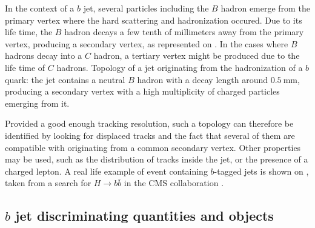     In the context of a $b$ jet, several particles including the $B$ hadron emerge from
    the primary vertex where the hard scattering and hadronization occured. Due to its
    life time, the $B$ hadron decays a few tenth of millimeters away from the primary
    vertex, producing a secondary vertex, as represented on .
    In the cases where $B$ hadrons decay into a $C$ hadron, a tertiary vertex might
    be produced due to the life time of $C$ hadrons.
                 {Topology of a jet originating from the hadronization of a $b$ quark: the
                 jet contains a neutral $B$ hadron with a decay length around $0.5~\text{mm}$,
                 producing a secondary vertex with a high multiplicity of charged particles
                 emerging from it.}

    Provided a good enough tracking resolution, such a topology can therefore be identified
    by looking for displaced tracks and the fact that several of them are compatible with
    originating from a common secondary vertex. Other properties may be used, such as the
    distribution of tracks inside the jet, or the presence of a charged lepton. A
    real life example of event containing $b$-tagged jets is shown on ,
    taken from a search for $H\rightarrow b\bar{b}$ in the CMS collaboration \cite{HIG-13-011}.


    \subsection{$b$ jet discriminating quantities and objects}

